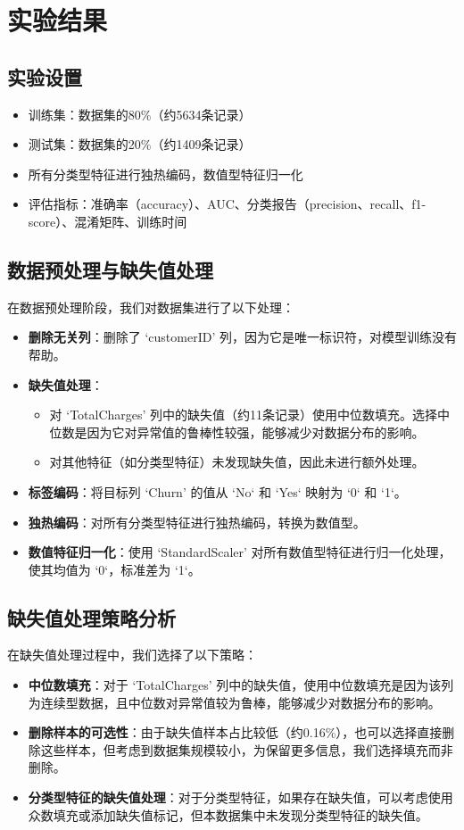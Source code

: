 \documentclass{article}
\begin{document}
\section{实验结果}

\subsection{实验设置}
\begin{itemize}
    \item 训练集：数据集的80\%（约5634条记录）
    \item 测试集：数据集的20\%（约1409条记录）
    \item 所有分类型特征进行独热编码，数值型特征归一化
    \item 评估指标：准确率（accuracy）、AUC、分类报告（precision、recall、f1-score）、混淆矩阵、训练时间
\end{itemize}

\subsection{数据预处理与缺失值处理}
在数据预处理阶段，我们对数据集进行了以下处理：
\begin{itemize}
    \item \textbf{删除无关列}：删除了 ‘customerID’ 列，因为它是唯一标识符，对模型训练没有帮助。
    \item \textbf{缺失值处理}：
    \begin{itemize}
        \item 对 ‘TotalCharges’ 列中的缺失值（约11条记录）使用中位数填充。选择中位数是因为它对异常值的鲁棒性较强，能够减少对数据分布的影响。
        \item 对其他特征（如分类型特征）未发现缺失值，因此未进行额外处理。
    \end{itemize}
    \item \textbf{标签编码}：将目标列 ‘Churn’ 的值从 `No` 和 `Yes` 映射为 `0` 和 `1`。
    \item \textbf{独热编码}：对所有分类型特征进行独热编码，转换为数值型。
    \item \textbf{数值特征归一化}：使用 ‘StandardScaler’ 对所有数值型特征进行归一化处理，使其均值为 `0`，标准差为 `1`。
\end{itemize}

\subsection{缺失值处理策略分析}
在缺失值处理过程中，我们选择了以下策略：
\begin{itemize}
    \item \textbf{中位数填充}：对于 ‘TotalCharges’ 列中的缺失值，使用中位数填充是因为该列为连续型数据，且中位数对异常值较为鲁棒，能够减少对数据分布的影响。
    \item \textbf{删除样本的可选性}：由于缺失值样本占比较低（约0.16\%），也可以选择直接删除这些样本，但考虑到数据集规模较小，为保留更多信息，我们选择填充而非删除。
    \item \textbf{分类型特征的缺失值处理}：对于分类型特征，如果存在缺失值，可以考虑使用众数填充或添加缺失值标记，但本数据集中未发现分类型特征的缺失值。
\end{itemize}
\end{document}
